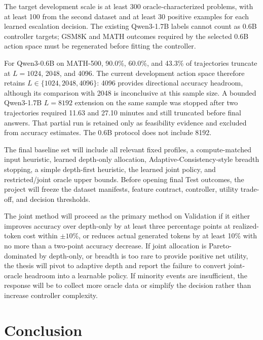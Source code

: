 \documentclass[runningheads]{llncs}
\begin{document}
The target development scale is at least 300 oracle-characterized problems,
with at least 100 from the second dataset and at least 30 positive examples for
each learned escalation decision. The existing Qwen3-1.7B labels cannot count
as 0.6B controller targets; GSM8K and MATH outcomes required by the selected
0.6B action space must be regenerated before fitting the controller.

For Qwen3-0.6B on MATH-500, 90.0\%, 60.0\%, and 43.3\% of trajectories
truncate at $L=1024$, 2048, and 4096. The current development action space
therefore retains $L\in\{1024,2048,4096\}$: 4096 provides directional accuracy
headroom, although its comparison with 2048 is inconclusive at this sample
size. A bounded Qwen3-1.7B $L=8192$ extension on the same sample was stopped
after two trajectories required 11.63 and 27.10 minutes and still truncated
before final answers. That partial run is retained only as feasibility evidence
and excluded from accuracy estimates. The 0.6B protocol does not include 8192.

The final baseline set will include all relevant fixed profiles, a
compute-matched input heuristic, learned depth-only allocation,
Adaptive-Consistency-style breadth stopping, a simple depth-first heuristic,
the learned joint policy, and restricted/joint oracle upper bounds. Before
opening final Test outcomes, the project will freeze the dataset manifests,
feature contract, controller, utility trade-off, and decision thresholds.

The joint method will proceed as the primary method on Validation if it either
improves accuracy over depth-only by at least three percentage points at
realized-token cost within $\pm10\%$, or reduces actual generated tokens by at
least 10\% with no more than a two-point accuracy decrease. If joint allocation
is Pareto-dominated by depth-only, or breadth is too rare to provide positive
net utility, the thesis will pivot to adaptive depth and report the failure to
convert joint-oracle headroom into a learnable policy. If minority events are
insufficient, the response will be to collect more oracle data or simplify the
decision rather than increase controller complexity.

\section{Conclusion}
\end{document}
